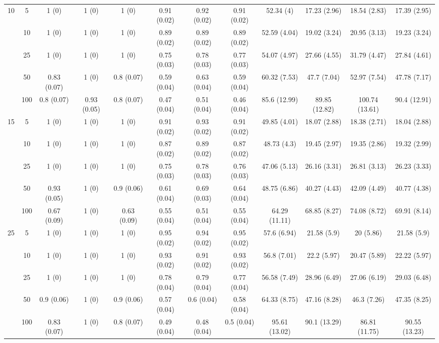 \documentclass[10pt]{article}
\theoremstyle{definition}
\begin{document}
\begin{table}[H]
\begin{center}
{\begin{tabular}{cc|ccc|ccc|cccc|}
  \multirow{5}{*}{10} & 5  & 1 (0) & 1 (0) & 1 (0) & 0.91 (0.02) & 0.92 (0.02) & 0.91 (0.02) & 52.34 (4) & 17.23 (2.96) & 18.54 (2.83) & 17.39 (2.95) \\ 
  & 10  & 1 (0) & 1 (0) & 1 (0) & 0.89 (0.02) & 0.89 (0.02) & 0.89 (0.02) & 52.59 (4.04) & 19.02 (3.24) & 20.95 (3.13) & 19.23 (3.24) \\ 
  & 25  & 1 (0) & 1 (0) & 1 (0) & 0.75 (0.03) & 0.78 (0.03) & 0.77 (0.03) & 54.07 (4.97) & 27.66 (4.55) & 31.79 (4.47) & 27.84 (4.61) \\ 
  & 50  & 0.83 (0.07) & 1 (0) & 0.8 (0.07) & 0.59 (0.04) & 0.63 (0.04) & 0.59 (0.04) & 60.32 (7.53) & 47.7 (7.04) & 52.97 (7.54) & 47.78 (7.17) \\ 
  & 100  & 0.8 (0.07) & 0.93 (0.05) & 0.8 (0.07) & 0.47 (0.04) & 0.51 (0.04) & 0.46 (0.04) & 85.6 (12.99) & 89.85 (12.82) & 100.74 (13.61) & 90.4 (12.91) \\[.3cm] 
  \multirow{5}{*}{15} & 5  & 1 (0) & 1 (0) & 1 (0) & 0.91 (0.02) & 0.93 (0.02) & 0.91 (0.02) & 49.85 (4.01) & 18.07 (2.88) & 18.38 (2.71) & 18.04 (2.88) \\ 
  & 10  & 1 (0) & 1 (0) & 1 (0) & 0.87 (0.02) & 0.89 (0.02) & 0.87 (0.02) & 48.73 (4.3) & 19.45 (2.97) & 19.35 (2.86) & 19.32 (2.99) \\ 
  & 25  & 1 (0) & 1 (0) & 1 (0) & 0.75 (0.03) & 0.78 (0.03) & 0.76 (0.03) & 47.06 (5.13) & 26.16 (3.31) & 26.81 (3.13) & 26.23 (3.33) \\ 
  & 50  & 0.93 (0.05) & 1 (0) & 0.9 (0.06) & 0.61 (0.04) & 0.69 (0.03) & 0.64 (0.04) & 48.75 (6.86) & 40.27 (4.43) & 42.09 (4.49) & 40.77 (4.38) \\ 
  & 100  & 0.67 (0.09) & 1 (0) & 0.63 (0.09) & 0.55 (0.04) & 0.51 (0.04) & 0.55 (0.04) & 64.29 (11.11) & 68.85 (8.27) & 74.08 (8.72) & 69.91 (8.14) \\[.3cm] 
  \multirow{5}{*}{25} & 5  & 1 (0) & 1 (0) & 1 (0) & 0.95 (0.02) & 0.94 (0.02) & 0.95 (0.02) & 57.6 (6.94) & 21.58 (5.9) & 20 (5.86) & 21.58 (5.9) \\ 
  & 10  & 1 (0) & 1 (0) & 1 (0) & 0.93 (0.02) & 0.91 (0.02) & 0.93 (0.02) & 56.8 (7.01) & 22.2 (5.97) & 20.47 (5.89) & 22.22 (5.97) \\ 
  & 25  & 1 (0) & 1 (0) & 1 (0) & 0.78 (0.04) & 0.79 (0.04) & 0.77 (0.04) & 56.58 (7.49) & 28.96 (6.49) & 27.06 (6.19) & 29.03 (6.48) \\ 
 & 50  & 0.9 (0.06) & 1 (0) & 0.9 (0.06) & 0.57 (0.04) & 0.6 (0.04) & 0.58 (0.04) & 64.33 (8.75) & 47.16 (8.28) & 46.3 (7.26) & 47.35 (8.25) \\ 
     & 100  & 0.83 (0.07) & 1 (0) & 0.8 (0.07) & 0.49 (0.04) & 0.48 (0.04) & 0.5 (0.04) & 95.61 (13.02) & 90.1 (13.29) & 86.81 (11.75) & 90.55 (13.23) \\
\end{tabular}}
   \end{center}
      \vspace{-.5cm}
\end{table}
\end{document}
